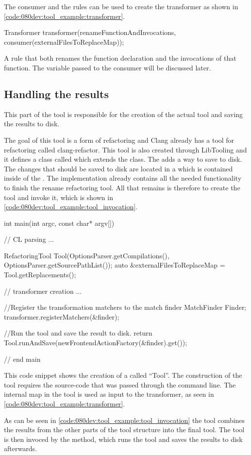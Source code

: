 The consumer and the rules can be used to create the transformer as shown in \cref{code:080dev:tool_example:transformer}.

\begin{listing}[H]
    \begin{cppcode}
Transformer transformer(renameFunctionAndInvocations, consumer(externalFilesToReplaceMap));
    \end{cppcode}
    \caption{A rule that both renames the function declaration and the invocations of that function. The  variable passed to the consumer will be discussed later.}
    \label{code:080dev:tool_example:transformer}
\end{listing}

\subsection{Handling the results}

This part of the tool is responsible for the creation of the actual tool and saving the results to disk. 

The goal of this tool is a form of refactoring and Clang already has a tool for refactoring called clang-refactor. This tool is also created through LibTooling and it defines a class called  which extends the  class. The  adds a way to save  to disk. The changes that should be saved to disk are located in a  which is contained inside of the . The  implementation already contains all the needed functionality to finish the rename refactoring tool. All that remains is therefore to create the tool and invoke it, which is shown in \cref{code:080dev:tool_example:tool_invocation}.


\begin{listing}[H]
    \begin{cppcode}
int main(int argc, const char* argv[]) {
// CL parsing
...

RefactoringTool Tool(OptionsParser.getCompilations(),
                     OptionsParser.getSourcePathList());
auto &externalFilesToReplaceMap = Tool.getReplacements();

// transformer creation
...

//Register the transformation matchers to the match finder
MatchFinder Finder;
transformer.registerMatchers(&finder);

//Run the tool and save the result to disk.
return Tool.runAndSave(newFrontendActionFactory(&finder).get());
} // end main
    \end{cppcode}
    \caption{This code snippet shows the creation of a  called ``Tool''. The construction of the tool requires the source-code that was passed through the command line. The internal map in the tool is used as input to the transformer, as seen in \cref{code:080dev:tool_example:transformer}.}
    \label{code:080dev:tool_example:tool_invocation}
\end{listing}

As can be seen in \cref{code:080dev:tool_example:tool_invocation} the tool combines the results from the other parts of the tool structure into the final tool. The tool is then invoced by the  method, which runs the tool and saves the results to disk afterwards. 
